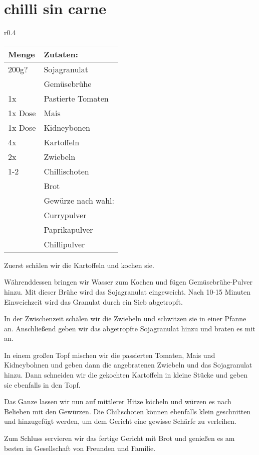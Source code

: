 \documentclass[../../book.tex]{subfiles}
\begin{document}
\section{chilli sin carne}
\begin{wraptable}{r}{0.4\textwidth}
    \centering
    \begin{tabularx}{0.39\textwidth}{|l|X|}
        \toprule
        Menge & Zutaten: \\
        \midrule
        200g? & Sojagranulat \\
        \midrule
        & Gemüsebrühe\\
        \midrule
        1x & Pastierte Tomaten \\
        \midrule
        1x Dose & Mais\\
        \midrule
        1x Dose & Kidneybonen\\
        \midrule
        4x & Kartoffeln\\
        \midrule
        2x & Zwiebeln\\
        \midrule
        1-2 & Chillischoten\\
        \midrule
        & Brot\\
        \midrule
        & Gewürze nach wahl:\\
        & Currypulver\\
        & Paprikapulver\\
        & Chillipulver\\
        \bottomrule
    \end{tabularx}
\end{wraptable}

Zuerst schälen wir die Kartoffeln und kochen sie.

Währenddessen bringen wir Wasser zum Kochen und fügen Gemüsebrühe-Pulver hinzu. Mit dieser Brühe wird das Sojagranulat eingeweicht. Nach 10-15 Minuten Einweichzeit wird das Granulat durch ein Sieb abgetropft.

In der Zwischenzeit schälen wir die Zwiebeln und schwitzen sie in einer Pfanne an. Anschließend geben wir das abgetropfte Sojagranulat hinzu und braten es mit an.

In einem großen Topf mischen wir die passierten Tomaten, Mais und Kidneybohnen und geben dann die angebratenen Zwiebeln und das Sojagranulat hinzu. Dann schneiden wir die gekochten Kartoffeln in kleine Stücke und geben sie ebenfalls in den Topf.

Das Ganze lassen wir nun auf mittlerer Hitze köcheln und würzen es nach Belieben mit den Gewürzen. Die Chilischoten können ebenfalls klein geschnitten und hinzugefügt werden, um dem Gericht eine gewisse Schärfe zu verleihen.

Zum Schluss servieren wir das fertige Gericht mit Brot und genießen es am besten in Gesellschaft von Freunden und Familie.

\newpage
\end{document}
